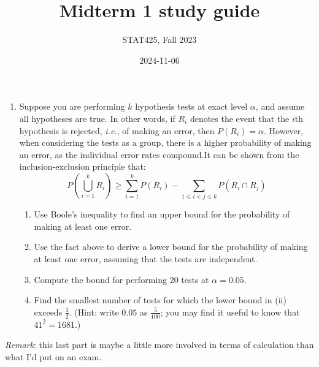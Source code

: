 \documentclass[
  letterpaper,
  DIV=11,
  numbers=noendperiod]{scrartcl}
\title{Midterm 1 study guide}
\author{STAT425, Fall 2023}
\date{2024-11-06}
\providecommand{\tightlist}{%
  \setlength{\itemsep}{0pt}\setlength{\parskip}{0pt}}\usepackage{longtable,booktabs,array}
\begin{document}
\maketitle

\pagestyle{fancy}  

\begin{enumerate}
\def\labelenumi{\arabic{enumi}.}
\tightlist
\item
  Suppose you are performing \(k\) hypothesis tests at exact level
  \(\alpha\), and assume all hypotheses are true. In other words, if
  \(R_i\) denotes the event that the \(i\)th hypothesis is rejected,
  \emph{i.e.}, of making an error, then \(P(R_i) = \alpha\). However,
  when considering the tests as a group, there is a higher probability
  of making an error, as the individual error rates compound.It can be
  shown from the inclusion-exclusion principle that: \[
  P\left(\bigcup_{i = 1}^k R_i\right) \geq \sum_{i = 1}^k P(R_i) - \sum_{1 \leq i < j \leq k} P(R_i \cap R_j)
  \]

  \begin{enumerate}
  \def\labelenumii{\roman{enumii}.}
  \tightlist
  \item
    Use Boole's inequality to find an upper bound for the probability of
    making at least one error.
  \item
    Use the fact above to derive a lower bound for the probability of
    making at least one error, assuming that the tests are independent.
  \item
    Compute the bound for performing 20 tests at \(\alpha = 0.05\).
  \item
    Find the smallest number of tests for which the lower bound in (ii)
    exceeds \(\frac{1}{2}\). (Hint: write \(0.05\) as \(\frac{5}{100}\);
    you may find it useful to know that \(41^2 = 1681\).)
  \end{enumerate}
\end{enumerate}

\emph{Remark}: this last part is maybe a little more involved in terms
of calculation than what I'd put on an exam.
\end{document}
